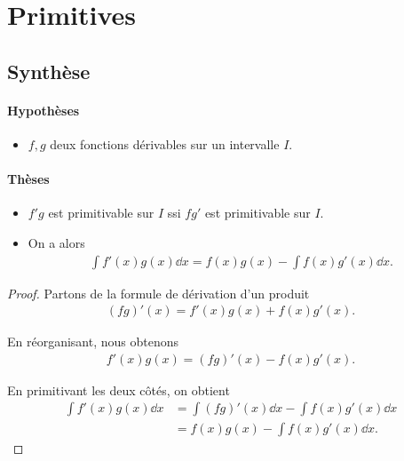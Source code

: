 \documentclass[main.tex]{subfiles}
\begin{document}
\chapter{Primitives}

\section{Synthèse}

\begin{proposition}

    \subsubsection{Hypothèses}
    \begin{itemize}
        \item $f, g$ deux fonctions dérivables sur un intervalle $I$.
    \end{itemize}

    \subsubsection{Thèses}
    \begin{itemize}
        \item $f' g$ est primitivable sur $I$ ssi $f g'$ est primitivable sur $I$.
        \item On a alors
            \begin{align}
                \int f'(x) g(x) \dd x
                = f(x) g(x)
                - \int f(x) g'(x) \dd x.
            \end{align}
    \end{itemize}
\end{proposition}
\begin{proof}
    Partons de la formule de dérivation d'un produit
    \begin{align*}
        (f g)'(x) = f'(x) g(x) + f(x) g'(x).
    \end{align*}

    En réorganisant,
    nous obtenons
    \begin{align*}
        f'(x) g(x) = (f g)'(x) - f(x) g'(x).
    \end{align*}

    En primitivant les deux côtés,
    on obtient
    \begin{align}
        \int f'(x) g(x) \dd x
        &= \int (f g)'(x) \dd x - \int f(x) g'(x) \dd x\\
        &= f(x) g(x) - \int f(x) g'(x) \dd x.
    \end{align}
\end{proof}
\end{document}
